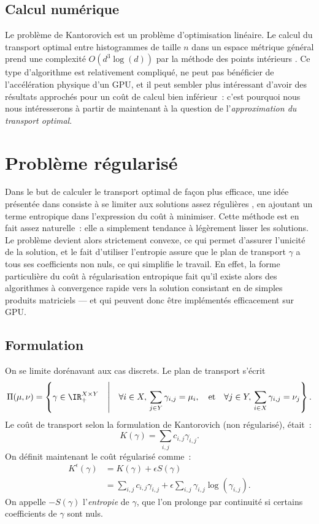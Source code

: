 \subsection{Calcul numérique}
Le problème de Kantorovich est un problème d'optimisation linéaire.
Le calcul du transport optimal entre histogrammes de taille $n$ dans un espace métrique général prend une complexité $O(d^3 \log(d))$ par la méthode des points intérieurs \cite{pele09}.
Ce type d'algorithme est relativement compliqué, ne peut pas bénéficier de l'accélération physique d'un GPU, et il peut sembler plus intéressant d'avoir des résultats approchés pour un coût de calcul bien inférieur~: c'est pourquoi nous nous intéresserons à partir de maintenant à la question de l'\emph{approximation du transport optimal}.

\section{Problème régularisé}
Dans le but de calculer le transport optimal de façon plus efficace, une idée présentée dans \cite{cuturi13} consiste à se limiter aux solutions \og assez régulières \fg, en ajoutant un terme entropique dans l'expression du coût à minimiser. Cette méthode est en fait assez naturelle~: elle a simplement tendance à légèrement lisser les solutions. Le problème devient alors strictement convexe, ce qui permet d'assurer l'unicité de la solution, et le fait d'utiliser l'entropie assure que le plan de transport $\gamma$ a tous ses coefficients non nuls, ce qui simplifie le travail. En effet, la forme particulière du coût à régularisation entropique fait qu'il existe alors des algorithmes à convergence rapide vers la solution consistant en de simples produits matriciels --- et qui peuvent donc être implémentés efficacement sur GPU.

\subsection{Formulation}
On se limite dorénavant aux cas discrets. Le plan de transport s'écrit 
\begin{equation}\label{eq:pi_discret}
\Pi(\mu,\nu) = \left\{ \gamma \in \IR_+^{X \times Y} \quad\middle|\quad
\forall i \in X,\,\sum_{j \in Y} \gamma_{i,j} = \mu_i , \quad
 \text{et} \quad
\forall j \in Y ,\,\sum_{i \in X} \gamma_{i,j} = \nu_j \right\}.
\end{equation}
Le coût de transport selon la formulation de Kantorovich (non régularisé), était~:
\[K(\gamma) = \sum_{i,j} c_{i,j} \gamma_{i,j}.\]
On définit maintenant le coût régularisé comme~:
\begin{equation}\label{eq:keps}
\begin{split}
K^\epsilon (\gamma) 
 &= K(\gamma) + \epsilon S(\gamma) \\
&= \sum_{i,j} c_{i,j} \gamma_{i,j} + \epsilon \sum_{i,j} \gamma_{i,j} \log(\gamma_{i,j}) . 
\end{split}\end{equation}
On appelle $-S(\gamma)$ l'\emph{entropie} de $\gamma$, que l'on prolonge par continuité si certains coefficients de $\gamma$ sont nuls.

